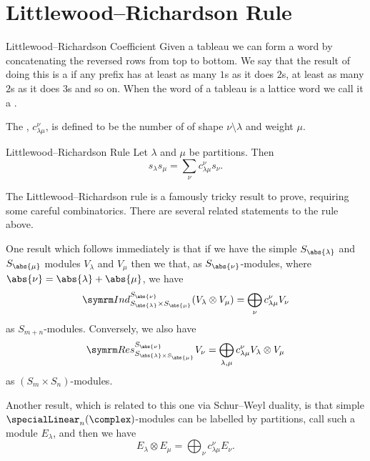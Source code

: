 \section{Littlewood--Richardson Rule}
\begin{dfn}{Littlewood--Richardson Coefficient}{}
    Given a tableau we can form a word by concatenating the reversed rows from top to bottom.
    We say that the result of doing this is a  if any prefix has at least as many \(1\)s as it does \(2\)s, at least as many \(2\)s as it does \(3\)s and so on.
    When the word of a tableau is a lattice word we call it a .
    
    The , \(c_{\lambda\mu}^\nu\), is defined to be the number of of shape \(\nu \setminus \lambda\) and weight \(\mu\).
\end{dfn}

\begin{thm}{Littlewood--Richardson Rule}{}
    Let \(\lambda\) and \(\mu\) be partitions.
    Then
    \begin{equation}
        s_\lambda s_\mu = \sum_{\nu} c^\nu_{\lambda\mu} s_\nu.
    \end{equation}
\end{thm}

The Littlewood--Richardson rule is a famously tricky result to prove, requiring some careful combinatorics.
There are several related statements to the rule above.

One result which follows immediately is that if we have the simple \(S_{\abs{\lambda}}\) and \(S_{\abs{\mu}}\) modules \(V_\lambda\) and \(V_\mu\) then we that, as \(S_{\abs{\nu}}\)-modules, where \(\abs{\nu} = \abs{\lambda} + \abs{\mu}\), we have
\begin{equation}
    \Ind^{S_{\abs{\nu}}}_{S_{\abs{\lambda}} \times S_{\abs{\mu}}} (V_\lambda \otimes V_\mu) = \bigoplus_{\nu} c^\nu_{\lambda\mu} V_\nu
\end{equation}
as \(S_{m + n}\)-modules.
Conversely, we also have
\begin{equation}
    \Res^{S_{\abs{\nu}}}_{S_{\abs{\lambda} \times S_{\abs{\mu}}}} V_\nu = \bigoplus_{\lambda,\mu} c^\nu_{\lambda\mu} V_\lambda \otimes V_\mu
\end{equation}
as \((S_m \times S_n)\)-modules.

Another result, which is related to this one via Schur--Weyl duality, is that simple \(\specialLinear_n(\complex)\)-modules can be labelled by partitions, call such a module \(E_\lambda\), and then we have
\begin{equation}
    E_\lambda \otimes E_\mu = \bigoplus_{\nu} c^\nu_{\lambda\mu}E_\nu.
\end{equation}

